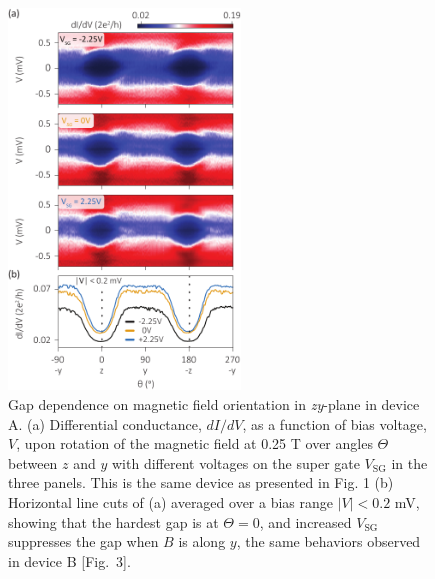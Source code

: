 \begin{figure}[p!]
\centering
\includegraphics[width=0.55\textwidth]{chapter_spinorbit/figures/SFig4_YZrot_Full1_reproduced.pdf}
\caption{\label{fig:YZrotRep}
Gap dependence on magnetic field orientation in \textit{zy}-plane in device A.
(a) Differential conductance, $dI/dV$, as a function of bias voltage, $V$, upon rotation of the magnetic field at 0.25 T over angles $\Theta$ between $z$ and $y$ with different voltages on the super gate $V_{\mathrm{SG}}$ in the three panels.
This is the same device as presented in Fig.
1 (b) Horizontal line cuts of (a) averaged over a bias range $|V| < 0.2$ mV, showing that the hardest gap is at $\Theta = 0$, and increased $V_{\mathrm{SG}}$ suppresses the gap when $B$ is along $y$, the same behaviors observed in device B [Fig.~3].
}
\end{figure}

